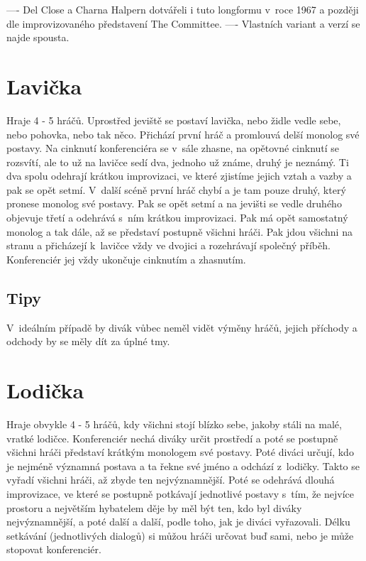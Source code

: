 ---- 
Del Close a Charna Halpern dotvářeli i tuto longformu v~roce 1967 a později dle improvizovaného představení The Committee. 
---- 
Vlastních variant a verzí se najde spousta. 
 
 
 
 
\needspace{5cm} \section{Lavička} \label{lavička} Hraje 4 - 5 hráčů. Uprostřed jeviště se postaví lavička, nebo židle vedle sebe, nebo pohovka, nebo tak něco. Přichází první hráč a promlouvá delší monolog své postavy. Na cinknutí konferenciéra se v~sále zhasne, na opětovné cinknutí se rozsvítí, ale to už na lavičce sedí dva, jednoho už známe, druhý je neznámý. Ti dva spolu odehrají krátkou improvizaci, ve které zjistíme jejich vztah a vazby a pak se opět setmí. V~další scéně první hráč chybí a je tam pouze druhý, který pronese monolog své postavy. Pak se opět setmí a na jevišti se vedle druhého objevuje třetí a odehrává s~ním krátkou improvizaci. Pak má opět samostatný monolog a tak dále, až se představí postupně všichni hráči. Pak jdou všichni na stranu a přicházejí k~lavičce vždy ve dvojici a rozehrávají společný příběh. Konferenciér jej vždy ukončuje cinknutím a zhasnutím. 
 
\subsection{ Tipy }  
V~ideálním případě by divák vůbec neměl vidět výměny hráčů, jejich příchody a odchody by se měly dít za úplné tmy. 
 
 
 
\needspace{5cm} \section{Lodička} \label{lodička} Hraje obvykle 4 - 5 hráčů, kdy všichni stojí blízko sebe, jakoby stáli na malé, vratké lodičce. Konferenciér nechá diváky určit prostředí a poté se postupně všichni hráči představí krátkým monologem své postavy. Poté diváci určují, kdo je nejméně významná postava a ta řekne své jméno a odchází z~lodičky. Takto se vyřadí všichni hráči, až zbyde ten nejvýznamnější. Poté se odehrává dlouhá improvizace, ve které se postupně potkávají jednotlivé postavy s~tím, že nejvíce prostoru a největším hybatelem děje by měl být ten, kdo byl diváky nejvýznamnější, a poté další a další, podle toho, jak je diváci vyřazovali. Délku setkávání (jednotlivých dialogů) si můžou hráči určovat buď sami, nebo je může stopovat konferenciér. 
 
